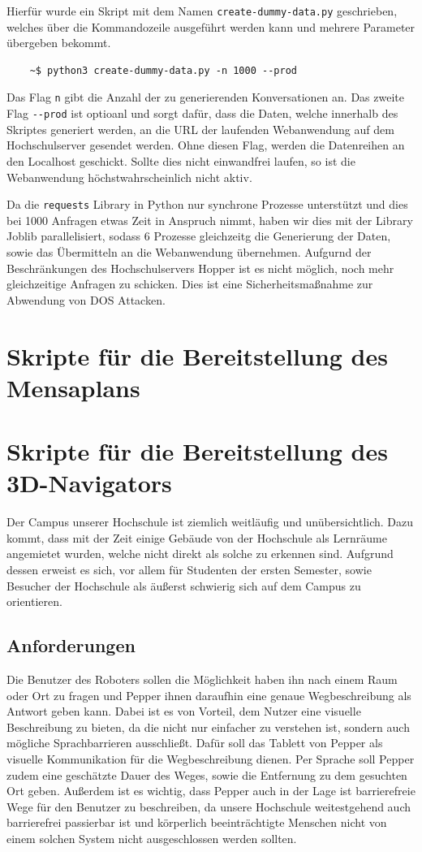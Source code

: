Hierfür wurde ein Skript mit dem Namen \verb|create-dummy-data.py| geschrieben, welches über die Kommandozeile ausgeführt werden kann
und mehrere Parameter übergeben bekommt.

\begin{lstlisting}
    ~$ python3 create-dummy-data.py -n 1000 --prod
\end{lstlisting}

Das Flag \verb|n| gibt die Anzahl der zu generierenden Konversationen an. Das zweite Flag \verb|--prod| ist optioanl und
sorgt dafür, dass die Daten, welche innerhalb des Skriptes generiert werden, an die URL der
laufenden Webanwendung auf dem Hochschulserver gesendet werden. Ohne diesen Flag, werden die Datenreihen an den Localhost geschickt.
Sollte dies nicht einwandfrei laufen, so ist die Webanwendung höchstwahrscheinlich nicht aktiv.

Da die \verb|requests| Library in Python nur synchrone Prozesse unterstützt und dies bei 1000 Anfragen etwas Zeit in Anspruch nimmt,
haben wir dies mit der Library Joblib parallelisiert, sodass 6 Prozesse gleichzeitg die Generierung der Daten, sowie das Übermitteln
an die Webanwendung übernehmen. Aufgurnd der Beschränkungen des Hochschulservers Hopper ist es nicht möglich, noch mehr
gleichzeitige Anfragen zu schicken. Dies ist eine Sicherheitsmaßnahme zur Abwendung von DOS Attacken.


\section{Skripte für die Bereitstellung des Mensaplans}

\newpage
\section{Skripte für die Bereitstellung des 3D-Navigators}

Der Campus unserer Hochschule ist ziemlich weitläufig und unübersichtlich. Dazu kommt, dass mit der Zeit einige Gebäude von der Hochschule als Lernräume angemietet wurden, welche nicht direkt als solche zu erkennen sind. Aufgrund dessen erweist es sich, vor allem für Studenten der ersten Semester, sowie Besucher der Hochschule als äußerst schwierig sich auf dem Campus zu orientieren.
\subsection{Anforderungen}
 Die Benutzer des Roboters sollen die Möglichkeit haben ihn nach einem Raum oder Ort zu fragen und Pepper ihnen daraufhin eine genaue Wegbeschreibung als Antwort geben kann. Dabei ist es von Vorteil, dem Nutzer eine visuelle Beschreibung zu bieten, da die nicht nur einfacher zu verstehen ist, sondern auch mögliche Sprachbarrieren ausschließt. Dafür soll das Tablett von Pepper als visuelle Kommunikation für die Wegbeschreibung dienen. Per Sprache soll Pepper zudem eine geschätzte Dauer des Weges, sowie die Entfernung zu dem gesuchten Ort geben. Außerdem ist es wichtig, dass Pepper auch in der Lage ist barrierefreie Wege für den Benutzer zu beschreiben, da unsere Hochschule weitestgehend auch barrierefrei passierbar ist und körperlich beeinträchtigte Menschen nicht von einem solchen System nicht ausgeschlossen werden sollten.
